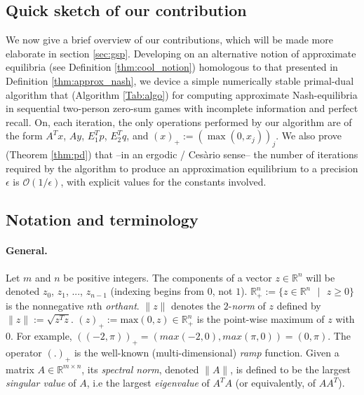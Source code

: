 \documentclass{article}
\DeclareMathOperator{\proj}{proj}
\begin{document}
\subsection{Quick sketch of our contribution}
\label{sec:sketch}
We now give a brief overview of our contributions, which will be made
more elaborate in section \ref{sec:gsp}.
Developing on an alternative notion of approximate equilibria (see
Definition \ref{thm:cool_notion})
homologous to that presented in Definition \ref{thm:approx_nash}, we
device a simple numerically stable primal-dual algorithm that
(Algorithm \ref{Tab:algo}) for computing approximate Nash-equilibria
in sequential two-person zero-sum games with incomplete information and
perfect recall. On, each iteration, the only operations performed by
our algorithm are of the form $A^Tx$, $Ay$, $E_1^Tp$, $E_2^Tq$, and
$(x)_+ := (\max(0, x_j))_j$. We also prove (Theorem \ref{thm:pd}) that
--in an ergodic / Ces\`ario sense-- the number of iterations required
by the algorithm to produce an approximation equilibrium to a
precision $\epsilon$ is $\mathcal{O}(1/\epsilon)$, with explicit
values for the constants involved.

\subsection{Notation and terminology}
\paragraph{General.} Let $m$ and $n$ be positive integers.
The components of a vector $z \in \mathbb{R}^n$ will be
denoted $z_0$, $z_1$, ..., $z_{n-1}$ (indexing begins from $0$,
not $1$). $\mathbb{R}^{n}_+ := \{z \in \mathbb{R}^{n}\text{ }|\text{ }
z \geq 0\}$ is the nonnegative $n$th \textit{orthant}.
$\|z\|$ denotes the $2$-\textit{norm} of $z$ defined by $\|z\| :=
\sqrt{z^Tz}$.  $(z)_+:=\text{max}(0, z) \in
\mathbb{R}^{n}_+$ is the point-wise maximum of $z$ with $0$. For
example, $((-2, \pi))_+ = (max(-2, 0), max(\pi, 0)) = (0, \pi)$. The
operator $(.)_+$ is the well-known (multi-dimensional) \textit{ramp}
function.
Given a matrix $A \in \mathbb{R}^{m \times n}$, its \textit{spectral
  norm}, denoted $\|A\|$, is
 defined to be the largest \textit{singular value} of $A$, i.e the
 largest \textit{eigenvalue} of $A^TA$ (or equivalently, of $AA^T$).
\end{document}
